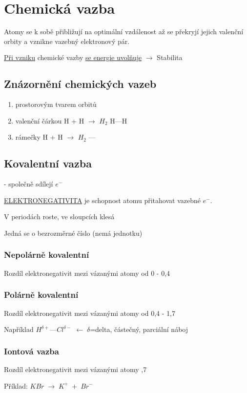 \section{Chemická vazba}
Atomy se k sobě přibližují na optimální vzdálenost až se překryjí jejich valenční orbity a vznikne vazebný elektronový pár.

\underline{Při vzniku} chemické vazby \underline{se energie uvolňuje} $\rightarrow$ Stabilita

\subsection{Znázornění chemických vazeb}
\TabPositions{0em, 15em, 30em}
\begin{enumerate}
    \item prostorovým tvarem orbitů
    \item valenční čárkou \tab H + H $\longrightarrow$ $H_2$ \tab H---H
    \item rámečky \tab H + H $\longrightarrow$ $H_2$ \tab \fbox{$\rightarrow$}---\fbox{$\leftarrow$}
\end{enumerate}

\subsection{Kovalentní vazba} - společně sdílejí $e^-$

\vspace{1em}
\underline{ELEKTRONEGATIVITA} je schopnost atomu přitahovat vazebné $e^-$.

V periodách roste, ve sloupcích klesá

Jedná se o bezrozměrné číslo (nemá jednotku)

\subsubsection{Nepolárně kovalentní}
Rozdíl elektronegativit mezi vázanými atomy od 0 - 0,4

\subsubsection{Polárně kovalentní}
Rozdíl elektronegativit mezi vázanými atomy od 0,4 - 1,7

Například $H^{\delta+}$---$Cl^{\delta-}$ $\longleftarrow \; \delta$=delta, částečný, parciální náboj

\subsubsection{Iontová vazba}
Rozdíl elektronegativit mezi vázanými atomy ,7

Příklad: \(KBr \; \longrightarrow \; K^+ \; + \; Br^-\)